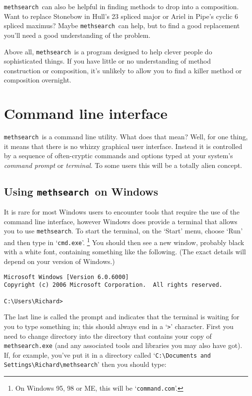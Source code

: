 \documentclass[a4paper,11pt,oneside]{book}
\makeatletter
\def\textitidx#1{\textit{#1}\index{#1}}
\newcommand{\symidx}[2]{} %
\def\methsearch{\texttt{meth\-search}}
\makeatother
\begin{document}
\methsearch\ can also be helpful in finding methods to drop into a 
composition.  Want to replace Stonebow in Hull's 23 spliced major 
or Ariel in Pipe's cyclic 6 spliced maximus?  Maybe \methsearch\ can help,
but to find a good replacement you'll need a good understanding of the problem.

Above all, \methsearch\ is a program designed to help clever 
people do sophisticated things.  If you have little or no understanding of
method construction or composition, it's unlikely to allow you to find
a killer method or composition overnight.

\section{Command line interface}\label{cli}

\methsearch\ is a command line utility.  
What does that mean?  Well, for one thing, it
means that there is no whizzy graphical user interface.
Instead it is controlled by a sequence of often-cryptic commands
and options typed at your system's \textitidx{command prompt} or 
\textitidx{terminal}.  To some users this will be a totally alien concept.  

\subsection{Using \methsearch\ on Windows}

It is rare for most Windows users to encounter tools that require the use 
of the command line interface, however Windows does provide a terminal 
that allows you to use \methsearch.  To start the terminal, on the 
`Start' menu, choose `Run' and then type in `\texttt{cmd.exe}'.%
%
\footnote{On Windows 95, 98 or ME, this will be `\texttt{command.com}'.%
}
You should then see a new window, probably black with a white font, 
containing something like the following.  (The exact details will 
depend on your version of Windows.)

\begin{Verbatim}
Microsoft Windows [Version 6.0.6000]
Copyright (c) 2006 Microsoft Corporation.  All rights reserved.

C:\Users\Richard>
\end{Verbatim}

The last line is called the prompt and indicates
that the terminal is waiting for you to type something in; 
this should always end in a `\verb+>+' character. %
First you need to change directory into the directory that contains
your copy of \texttt{methsearch.exe} (and any associated tools and libraries
you may also have got).  If, for example, you've put it in a directory called
`\verb+C:\Documents and Settings\Richard\methsearch+' then you should
type:
\end{document}
